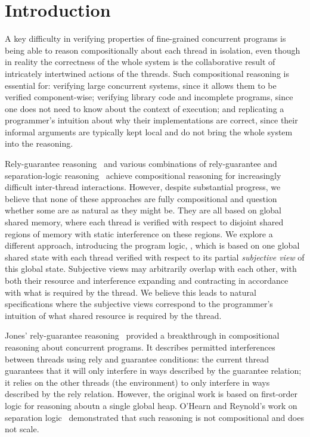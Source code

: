 \section{Introduction}
\label{sec:introduction}



A key difficulty in verifying properties of fine-grained concurrent
programs is being able to reason compositionally about each thread in
isolation, even though in reality the correctness of the whole system
is the collaborative result of intricately intertwined actions of the
threads.  Such compositional reasoning is essential for: verifying
large concurrent systems, since it allows them to be verified
component-wise;  verifying library code and incomplete programs,
since one does not need to know about the context of execution; and 
replicating a programmer's intuition about why their implementations
are correct, since their informal arguments are typically  kept local and do
not bring the whole system into the reasoning.


Rely-guarantee reasoning~\cite{rg} and various combinations of
rely-guarantee and separation-logic
reasoning~\cite{viktor-marriage,dg,lrg,cap-ecoop10,icap,tada} achieve
compositional reasoning for increasingly difficult inter-thread
interactions. However, despite substantial progress, we believe that
none of these approaches are fully compositional and question whether
some are as natural as they might be. They are all based on global
shared memory, where each thread is verified with respect to
disjoint shared regions of memory  with static
interference on these regions. We explore a different approach, introducing the
program logic, \colosl, which is based on one global shared state with
each thread verified with respect to its partial {\em subjective view}
of this global state. Subjective views may arbitrarily overlap with
each other, with both their resource and interference expanding and
contracting  in accordance with what is required by the thread.
We believe this leads to natural  specifications where the subjective
views correspond to the  programmer's intuition of what shared
resource
is required by the thread. 


Jones' rely-guarantee reasoning~\cite{rg} provided a
breakthrough in compositional reasoning about concurrent programs. It
describes permitted interferences between threads using rely and
guarantee conditions: the current thread guarantees that it will only
interfere in ways described by the guarantee relation; it relies on
the other threads (the environment) to only interfere in ways
described by the rely relation. However, the original work is based on
first-order logic for reasoning aboutn
a single global heap. O'Hearn and Reynold's
work on separation logic~\cite{2001popland john's survey} demonstrated that such reasoning is not
compositional and does not scale. 


